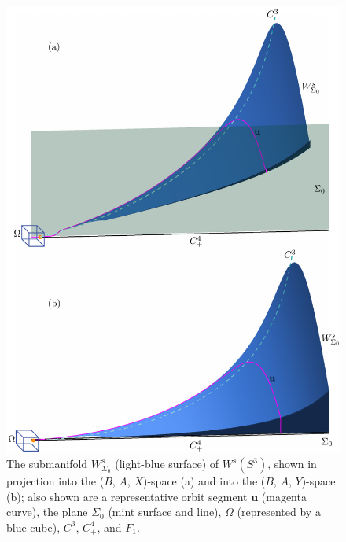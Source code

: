 \documentclass{ws-ijbc}
\begin{document}
\begin{figure}[H]
\centering
\includegraphics[]{./figures/MKMO_4.pdf}
\caption{The submanifold $W^{s}_{\Sigma_0}$ (light-blue surface) of $W^s(S^3)$, shown in projection into the ($B$, $A$, $X$)-space (a) and into the ($B$, $A$, $Y$)-space (b); also shown are a representative orbit segment $\mathbf{u}$ (magenta curve), the plane $\Sigma_0$ (mint surface and line), $\Omega$ (represented by a blue cube), $C^3$, $C^4_+$, and $F_1$.}
\label{figure_4}
\end{figure}
\end{document}
